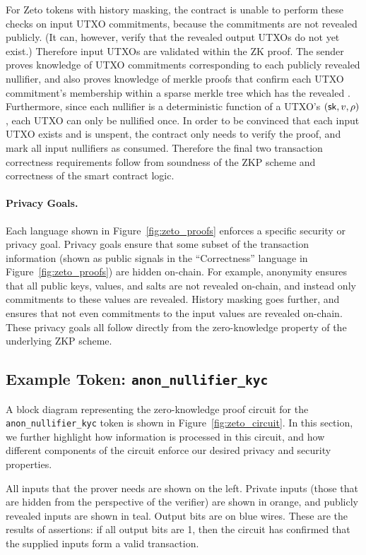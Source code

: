 For Zeto tokens with history masking, the contract is unable to perform these checks on input UTXO commitments, because the commitments are not revealed publicly. (It can, however, verify that the revealed output UTXOs do not yet exist.) Therefore input UTXOs are validated within the ZK proof. The sender proves knowledge of UTXO commitments corresponding to each publicly revealed nullifier, and also proves knowledge of merkle proofs that confirm each UTXO commitment's membership within a sparse merkle tree which has the revealed . Furthermore, since each nullifier is a deterministic function of a UTXO's $(\mathsf{sk}, v, \rho)$, each UTXO can only be nullified once. In order to be convinced that each input UTXO exists and is unspent, the contract only needs to verify the proof, and mark all input nullifiers as consumed. Therefore the final two transaction correctness requirements follow from soundness of the ZKP scheme and correctness of the smart contract logic.

\paragraph{Privacy Goals.} %
Each language shown in Figure~\ref{fig:zeto_proofs} enforces a specific security or privacy goal. Privacy goals ensure that some subset of the transaction information (shown as public signals in the ``Correctness'' language in Figure~\ref{fig:zeto_proofs}) are hidden on-chain. For example, anonymity ensures that all public keys, values, and salts are not revealed on-chain, and instead only commitments to these values are revealed. History masking goes further, and ensures that not even commitments to the input values are revealed on-chain. These privacy goals all follow directly from the zero-knowledge property of the underlying ZKP scheme.

\subsection{Example Token: \texttt{anon\_nullifier\_kyc}}

A block diagram representing the zero-knowledge proof circuit for the \texttt{anon\_nullifier\_kyc} token is shown in Figure~\ref{fig:zeto_circuit}. In this section, we further highlight how information is processed in this circuit, and how different components of the circuit enforce our desired privacy and security properties.

All inputs that the prover needs are shown on the left. Private inputs (those that are hidden from the perspective of the verifier) are shown in orange, and publicly revealed inputs are shown in teal. Output bits are on blue wires. These are the results of assertions: if all output bits are 1, then the circuit has confirmed that the supplied inputs form a valid transaction.



